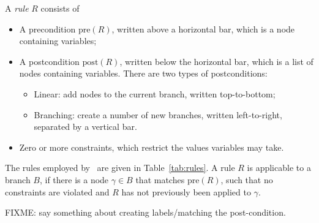 A {\em rule} $R$ consists of
\begin{itemize}
\item A precondition $\mathrm{pre}(R)$, written above a horizontal bar, which
is a node containing variables;
\item A postcondition $\mathrm{post}(R)$, written below the horizontal bar,
which is a list of nodes containing variables. There are two types of
postconditions:
\begin{itemize}
\item Linear: add nodes to the current branch, written top-to-bottom;
\item Branching: create a number of new branches, written left-to-right, separated by a vertical bar.
\end{itemize}
\item Zero or more constraints, which restrict the values variables may take.
\end{itemize}
The rules employed by \oops\ are given in Table~\ref{tab:rules}. A rule $R$ is
applicable to a branch $B$, if there is a node $\gamma \in B$ that matches
$\mathrm{pre}(R)$, such that no constraints are violated and $R$ has not
previously been applied to $\gamma$.

FIXME: say something about creating labels/matching the post-condition.

